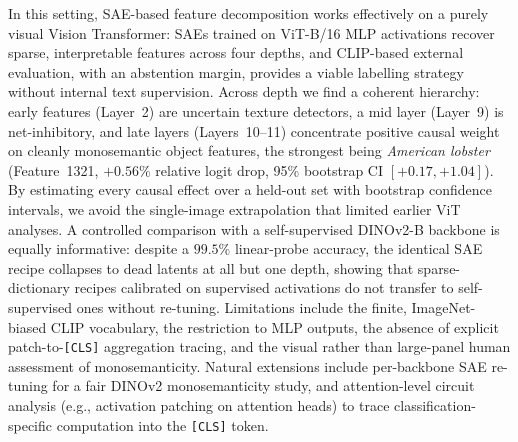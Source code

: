 In this setting, SAE-based feature decomposition works effectively on a purely visual Vision Transformer: SAEs trained on ViT-B/16 MLP activations recover sparse, interpretable features across four depths, and CLIP-based external evaluation, with an abstention margin, provides a viable labelling strategy without internal text supervision. Across depth we find a coherent hierarchy: early features (Layer~2) are uncertain texture detectors, a mid layer (Layer~9) is net-inhibitory, and late layers (Layers~10--11) concentrate positive causal weight on cleanly monosemantic object features, the strongest being \textit{American lobster} (Feature~1321, $+0.56\%$ relative logit drop, 95\% bootstrap CI $[+0.17,+1.04]$). By estimating every causal effect over a held-out set with bootstrap confidence intervals, we avoid the single-image extrapolation that limited earlier ViT analyses. A controlled comparison with a self-supervised DINOv2-B backbone is equally informative: despite a $99.5\%$ linear-probe accuracy, the identical SAE recipe collapses to dead latents at all but one depth, showing that sparse-dictionary recipes calibrated on supervised activations do not transfer to self-supervised ones without re-tuning. Limitations include the finite, ImageNet-biased CLIP vocabulary, the restriction to MLP outputs, the absence of explicit patch-to-\texttt{[CLS]} aggregation tracing, and the visual rather than large-panel human assessment of monosemanticity. Natural extensions include per-backbone SAE re-tuning for a fair DINOv2 monosemanticity study, and attention-level circuit analysis (e.g., activation patching on attention heads) to trace classification-specific computation into the \texttt{[CLS]} token.
